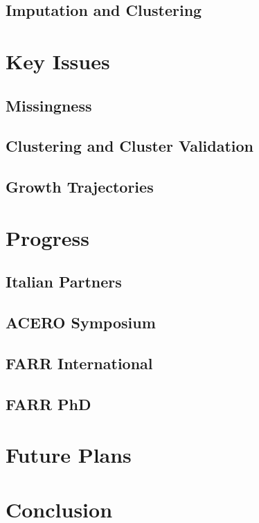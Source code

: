 \documentclass[bsc]{abdnthesis}
\begin{document}
\section{Imputation and Clustering} %
\label{sec:imputation_and_clustering}


\chapter{Key Issues}
\section{Missingness} %
\label{sec:missingness}

\section{Clustering and Cluster Validation} %
\label{sec:clustering_and_cluster_validation}

\section{Growth Trajectories} %
\label{sec:growth_trajectories}



\chapter{Progress}
\section{Italian Partners} %
\label{sec:italian_partners}

\section{ACERO Symposium} %
\label{sec:acero_symposium}

\section{FARR International} %
\label{sec:farr_international}

\section{FARR PhD} %
\label{sec:farr_phd}



\chapter{Future Plans}


\chapter{Conclusion}



\end{document}
